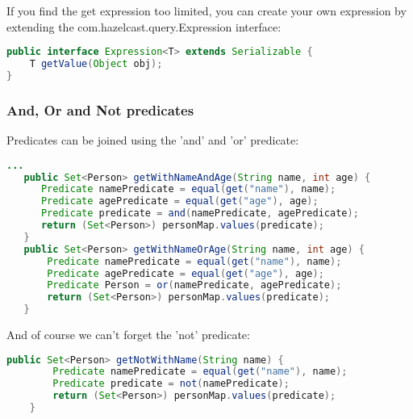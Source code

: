 If you find the get expression too limited, you can create your own expression by extending the com.hazelcast.query.Expression interface:
\begin{lstlisting}[language=java]
public interface Expression<T> extends Serializable {
    T getValue(Object obj);
}
\end{lstlisting}

\subsubsection*{And, Or and Not predicates}
Predicates can be joined using the 'and' and 'or' predicate:
\begin{lstlisting}[language=java]
   ...
   public Set<Person> getWithNameAndAge(String name, int age) {
      Predicate namePredicate = equal(get("name"), name);
      Predicate agePredicate = equal(get("age"), age);
      Predicate predicate = and(namePredicate, agePredicate);
      return (Set<Person>) personMap.values(predicate);
   }
   public Set<Person> getWithNameOrAge(String name, int age) {
       Predicate namePredicate = equal(get("name"), name);
       Predicate agePredicate = equal(get("age"), age);
       Predicate Person = or(namePredicate, agePredicate);
       return (Set<Person>) personMap.values(predicate);
   }
\end{lstlisting}
And of course we can't forget the 'not' predicate:
\begin{lstlisting}[language=java]
    public Set<Person> getNotWithName(String name) {
        Predicate namePredicate = equal(get("name"), name);
        Predicate predicate = not(namePredicate);
        return (Set<Person>) personMap.values(predicate);
    }
\end{lstlisting}

